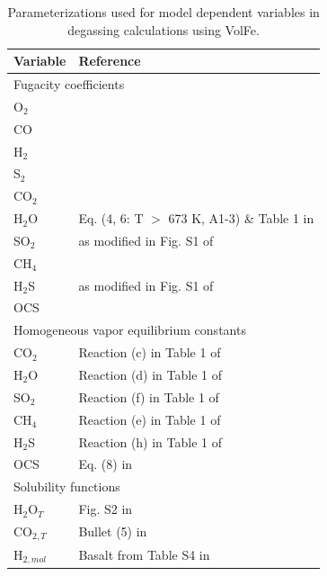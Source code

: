 \begin{table}[!thbp]
    \centering
    \caption{Parameterizations used for model dependent variables in degassing calculations using VolFe.}
    \begin{tabular}{ll}
        \toprule
        Variable &	Reference \\
        \midrule
        \multicolumn{2}{l}{Fugacity coefficients} \\
        \midrule
        O$_2$ &	\textcite{shi1992} \\
        CO &	\textcite{shi1992} \\
        H$_2$ &	\textcite{shaw1964} \\
        S$_2$ &	\textcite{shi1992} \\
        CO$_2$ &	\textcite{shi1992} \\
        H$_2$O &	Eq. (4, 6: T $>$ 673 K, A1-3) \& Table 1 in \textcite{holland1991} \\
        SO$_2$ &	\textcite{shi1992} as modified in Fig. S1 of \textcite{Hughes2023} \\
        CH$_4$ &	\textcite{shi1992} \\
        H$_2$S &	\textcite{shi1992} as modified in Fig. S1 of \textcite{hughes2024} \\
        OCS &	\textcite{shi1992} \\
        \midrule
        \multicolumn{2}{l}{Homogeneous vapor equilibrium constants} \\
        \midrule
        CO$_2$ &	Reaction (c) in Table 1 of \textcite{ohmoto1977} \\
        H$_2$O &	Reaction (d) in Table 1 of \textcite{ohmoto1977} \\
        SO$_2$ &	Reaction (f) in Table 1 of \textcite{ohmoto1977} \\
        CH$_4$ &	Reaction (e) in Table 1 of \textcite{ohmoto1977} \\
        H$_2$S &	Reaction (h) in Table 1 of \textcite{ohmoto1977} \\
        OCS &	Eq. (8) in \textcite{moussallam2019} \\
        \midrule
        \multicolumn{2}{l}{Solubility functions} \\
        \midrule
        H$_2$O$_T$ &	Fig. S2 in \textcite{hughes2024} \\
        CO$_{2,T}$ &	Bullet (5) in \textcite{dixon1995} \\
        H$_{2,mol}$ &	Basalt from Table S4 in \textcite{hughes2024} \\

\end{tabular}
\end{table}

